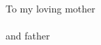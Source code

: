 \thispagestyle{empty}

\pagebreak
\hspace{0pt}
\vfill
\begin{center}
To my loving mother \\
\textbf{\firstAuthorMotherName} \\
and father \\
\textbf{\firstAuthorFatherName}
\end{center}
\vfill
\hspace{0pt}
\pagebreak